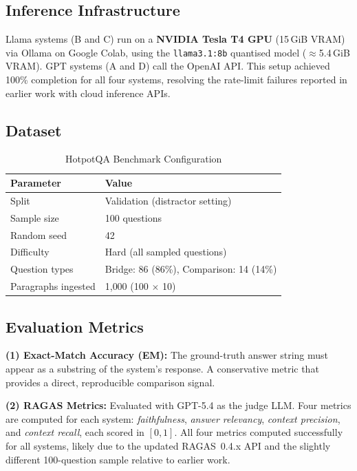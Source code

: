 \documentclass[12pt]{article}
\begin{document}
\subsection{Inference Infrastructure}

Llama systems (B and C) run on a \textbf{NVIDIA Tesla T4 GPU} (15\,GiB VRAM)
via Ollama on Google Colab, using the \texttt{llama3.1:8b} quantised model
($\approx$5.4\,GiB VRAM).  GPT systems (A and D) call the OpenAI API.
This setup achieved 100\% completion for all four systems, resolving the
rate-limit failures reported in earlier work with cloud inference APIs.

\subsection{Dataset}

\begin{table}[H]
\centering
\caption{HotpotQA Benchmark Configuration}
\label{tab:dataset}
\begin{tabular}{ll}
\toprule
\textbf{Parameter} & \textbf{Value} \\
\midrule
Split              & Validation (distractor setting) \\
Sample size        & 100 questions \\
Random seed        & 42 \\
Difficulty         & Hard (all sampled questions) \\
Question types     & Bridge: 86 (86\%), Comparison: 14 (14\%) \\
Paragraphs ingested & 1{,}000 (100 $\times$ 10) \\
\bottomrule
\end{tabular}
\end{table}

\subsection{Evaluation Metrics}

\textbf{(1) Exact-Match Accuracy (EM):} The ground-truth answer string must
appear as a substring of the system's response.  A conservative metric that
provides a direct, reproducible comparison signal.

\textbf{(2) RAGAS Metrics:} Evaluated with GPT-5.4 as the judge LLM.  Four
metrics are computed for each system: \emph{faithfulness},
\emph{answer relevancy}, \emph{context precision}, and \emph{context recall},
each scored in $[0,1]$.  All four metrics computed successfully for all systems,
likely due to the updated RAGAS~0.4.x API and the slightly different 100-question
sample relative to earlier work.
\end{document}
